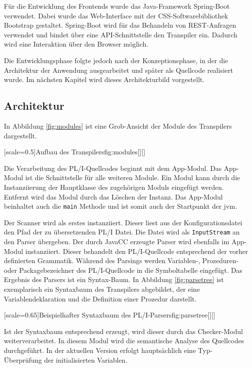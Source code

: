 Für die Entwicklung des Frontends wurde das Java-Framework Spring-Boot verwendet.
Dabei wurde das Web-Interface mit der CSS-Softwarebibliothek Bootstrap gestaltet.
Spring-Boot wird für das Behandeln von REST-Anfragen verwendet und bindet über eine API-Schnittstelle den Transpiler ein.
Dadurch wird eine Interaktion über den Browser möglich.

Die Entwicklungsphase folgte jedoch nach der Konzeptionsphase, in der die Architektur der Anwendung ausgearbeitet und später als Quellcode realisiert wurde. 
Im nächsten Kapitel wird dieses Architekturbild vorgestellt.

\pagebreak
\subsection{Architektur} 

In Abbildung \ref{fig:modules} ist eine Grob-Ansicht der Module des Transpilers dargestellt.

[scale=0.5]{Aufbau des Transpilers}{fig:modules}[][]

Die Verarbeitung des PL/I-Quellcodes beginnt mit dem App-Modul. Das App-Modul ist die Schnittstelle für alle weiteren Module. Ein Modul kann durch die Instanziierung der Hauptklasse des zugehörigen Moduls eingefügt werden. Entfernt wird das Modul durch das Löschen der Instanz. Das App-Modul beinhaltet auch die \verb+main+ Methode und ist somit auch der Startpunkt der \ac{jvm}.

Der Scanner wird als erstes instanziiert. Dieser liest aus der Konfigurationsdatei den Pfad der zu übersetzenden PL/I Datei. Die Datei wird als \verb+InputStream+ an den Parser übergeben.
Der durch JavaCC erzeugte Parser wird ebenfalls im App-Modul instanziiert. Dieser behandelt den PL/I-Quellcode entsprechend der vorher definierten Grammatik.  Während des Parsings werden Variablen-, Prozeduren- oder Packagebezeichner des PL/I-Quellcode in die Symboltabelle eingefügt. Das Ergebnis des Parsers ist ein Syntax-Baum. 
\pagebreak
In Abbildung \ref{fig:parsetree} ist exemplarisch ein Syntaxbaum des Transpilers abgebildet, der eine Variablendeklaration und die Definition einer Prozedur darstellt.

[scale=0.65]{Beispielhafter Syntaxbaum des PL/I-Parsers}{fig:parsetree}[][]

Ist der Syntaxbaum entsprechend erzeugt, wird dieser durch das Checker-Modul weiterverarbeitet. In diesem Modul wird die semantische Analyse des Quellcodes durchgeführt. In der aktuellen Version erfolgt hauptsächlich eine Typ-Überprüfung der initialisierten Variablen.

